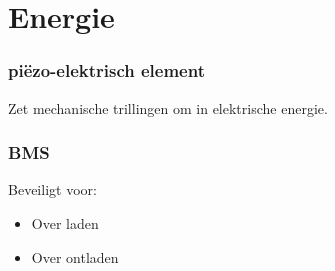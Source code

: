 \section{Energie}
    \begin{frame}
        \frametitle{piëzo-elektrisch element}
    
        Zet mechanische trillingen om in elektrische energie.
    
    \end{frame}
    \begin{frame}
        \frametitle{BMS}
    
        Beveiligt voor:
        \begin{itemize}
            \item Over laden
            \item Over ontladen
        \end{itemize}
    
    \end{frame}
    
        
    
